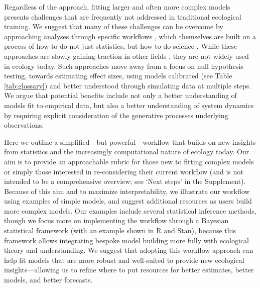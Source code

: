 \documentclass[11pt]{article}
\begin{document}
Regardless of the approach, fitting larger and often more complex models presents challenges that are frequently not addressed in traditional ecological training. We suggest that many of these challenges can be overcome by approaching analyses through specific workflows \citep{betanworkflow,grinsztajn2021,vandeschoot2021}, which themselves are built on a process of how to do not just statistics, but how to do science \citep{box1976science}. While these approaches are slowly gaining traction in other fields \citep[e.g.,][]{esfahani2021bayesian,schad2021,bouman2024bayesian}, they are not widely used in ecology today. Such approaches move away from a focus on null hypothesis testing, towards estimating effect sizes, using models calibrated (see Table \ref{tab:glossary}) and better understood through simulating data at multiple steps. We argue that potential benefits include not only a better understanding of models fit to empirical data, but also a better understanding of system dynamics by requiring explicit consideration of the generative processes underlying observations. %

Here we outline a simplified---but powerful---workflow that builds on new insights from statistics  \citep{betanworkflow,gelman2020bayesian,vandeschoot2021} and the increasingly computational nature of ecology today. Our aim is to provide an approachable rubric for those new to fitting complex models or simply those interested in re-considering their current workflow (and is not intended to be a comprehensive overview; see `Next steps' in the Supplement). Because of this aim and to maximize interpretability, we illustrate our workflow using examples of simple models, and suggest additional resources as users build more complex models. Our examples include several statistical inference methods, though we focus more on implementing the workflow through a Bayesian statistical framework (with an example shown in \textsf{R} and \textsf{Stan}), because this framework allows integrating bespoke model building more fully with ecological theory and understanding.  We suggest that adopting this workflow approach can help fit models that are more robust and well-suited to provide new ecological insights---allowing us to refine where to put resources for better estimates, better models, and better forecasts.
\end{document}
